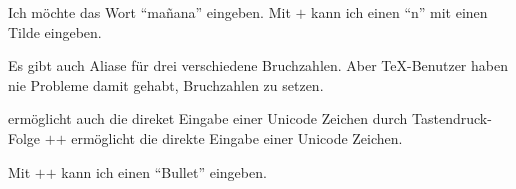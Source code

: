 Ich möchte das Wort \enquote{mañana} eingeben. Mit %
\hbox{\Ctrl$+$}%
%
%
\space%
kann ich einen \enquote{n} mit einen Tilde eingeben.

Es gibt auch Aliase für drei verschiedene Bruchzahlen. Aber
\TeX{}-Benutzer haben nie Probleme damit gehabt, Bruchzahlen
zu setzen.

\label{unicodeviagedit}

 ermöglicht auch die direket Eingabe einer Unicode
Zeichen durch Tastendruck-Folge %
\hbox{\Shift$+$\Ctrl$+$}%
%
\Return{}%
\space%
ermöglicht die direkte Eingabe einer Unicode
Zeichen.

Mit %
\hbox{\Shift$+$\Ctrl$+$}%
%
%
%
%
\Return{}%
\space%
kann ich einen \enquote{Bullet} eingeben.










